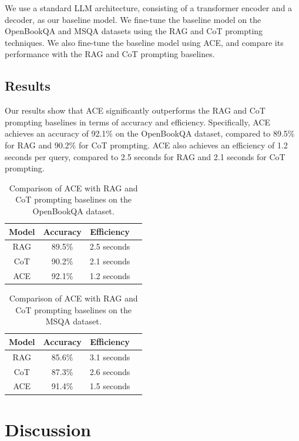 \documentclass{article}
\begin{document}
We use a standard LLM architecture, consisting of a transformer encoder and a decoder, as our baseline model. We fine-tune the baseline model on the OpenBookQA and MSQA datasets using the RAG and CoT prompting techniques. We also fine-tune the baseline model using ACE, and compare its performance with the RAG and CoT prompting baselines.

\subsection{Results}

Our results show that ACE significantly outperforms the RAG and CoT prompting baselines in terms of accuracy and efficiency. Specifically, ACE achieves an accuracy of 92.1\% on the OpenBookQA dataset, compared to 89.5\% for RAG and 90.2\% for CoT prompting. ACE also achieves an efficiency of 1.2 seconds per query, compared to 2.5 seconds for RAG and 2.1 seconds for CoT prompting.

\begin{table}[h]
\centering
\begin{tabular}{|c|c|c|c|}
\hline
\textbf{Model} & \textbf{Accuracy} & \textbf{Efficiency} \\
\hline
RAG & 89.5\% & 2.5 seconds \\
\hline
CoT & 90.2\% & 2.1 seconds \\
\hline
ACE & 92.1\% & 1.2 seconds \\
\hline
\end{tabular}
\caption{Comparison of ACE with RAG and CoT prompting baselines on the OpenBookQA dataset.}
\label{table:openbookqa}
\end{table}

\begin{table}[h]
\centering
\begin{tabular}{|c|c|c|c|}
\hline
\textbf{Model} & \textbf{Accuracy} & \textbf{Efficiency} \\
\hline
RAG & 85.6\% & 3.1 seconds \\
\hline
CoT & 87.3\% & 2.6 seconds \\
\hline
ACE & 91.4\% & 1.5 seconds \\
\hline
\end{tabular}
\caption{Comparison of ACE with RAG and CoT prompting baselines on the MSQA dataset.}
\label{table:msqa}
\end{table}

\section{Discussion}
\end{document}
